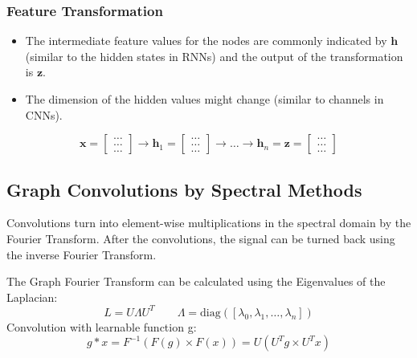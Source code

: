 \subsubsection{Feature Transformation}
\begin{itemize}
    \item The intermediate feature values for the nodes are commonly indicated by \(\mathbf{h}\) (similar to the hidden states in RNNs) and the output of the transformation is \(\mathbf{z}\).
    \item The dimension of the hidden values might change (similar to channels in CNNs).
\end{itemize}
\[
\mathbf{x} = 
\begin{bmatrix}
\dots \\
\dots \\
\dots
\end{bmatrix}
\longrightarrow
\mathbf{h}_1 = 
\begin{bmatrix}
\dots \\
\dots \\
\dots 
\end{bmatrix}
\longrightarrow
\hdots
\longrightarrow
\mathbf{h}_n = \mathbf{z} = 
\begin{bmatrix}
\dots \\
\dots \\
\dots
\end{bmatrix}
\]

\subsection{Graph Convolutions by Spectral Methods}
Convolutions turn into element-wise multiplications in the spectral domain by the Fourier Transform.
After the convolutions, the signal can be turned back using the inverse Fourier Transform.

The Graph Fourier Transform can be calculated using the Eigenvalues of the Laplacian:
\[
L = U\Lambda U^T \qquad \Lambda = \text{diag}(\left[\lambda_0,\lambda_1,\dots,\lambda_n\right])
\]
Convolution with learnable function g:
\[
g \ast x = F^{-1}(F(g)\times F(x)) = U(U^Tg\times U^Tx)
\]
